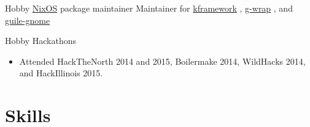 \documentclass[10pt,letterpaper,sans]{moderncv}
\newcommand{\wlink}[2]{\textcolor[HTML]{0071E6}{\href{#1}{#2}}}
\newcommand{\nixpkg}[2]{%
  \wlink{https://github.com/NixOS/nixpkgs/tree/master/pkgs/#1/#2/default.nix}%
        {#2}%
}
\begin{document}
        {Hobby}
        {\wlink{http://nixos.org}{NixOS} package maintainer}
        {}{}{
Maintainer for %
\nixpkg{applications/science/programming}{kframework}, %
\nixpkg{development/tools/guile}{g-wrap}, and %
\nixpkg{development/tools/guile-modules}{guile-gnome}%
}

        {Hobby}
        {Hackathons}
        {}{}{
  \begin{itemize}
  \item Attended HackTheNorth 2014 and 2015, Boilermake 2014, 
        WildHacks 2014, and HackIllinois 2015.
  \end{itemize}
}

\section{Skills}

\newpage
\end{document}
